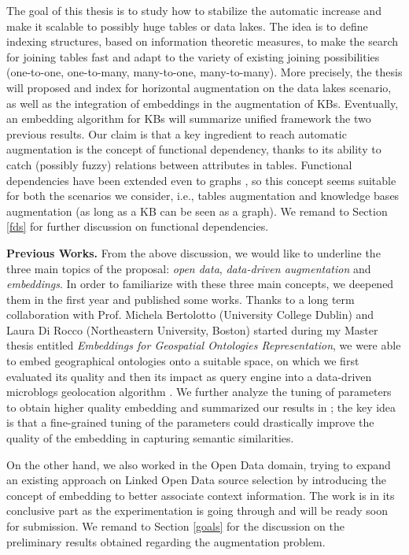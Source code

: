 The goal of this thesis is to study how to stabilize the automatic increase and make it scalable to possibly huge tables or data lakes. The idea is to define indexing structures, based on information theoretic measures, to make the search for joining tables fast and adapt to the variety of existing joining possibilities (one-to-one, one-to-many, many-to-one, many-to-many). More precisely, the thesis will proposed and index for horizontal augmentation on the data lakes scenario, as well as the integration of embeddings in the augmentation of KBs. Eventually, an embedding algorithm for KBs will summarize unified framework the two previous results. Our claim is that a key ingredient to reach automatic augmentation is the concept of functional dependency, thanks to its ability to catch (possibly fuzzy) relations between attributes in tables. Functional dependencies have been extended even to graphs \cite{fan2016functional}, so this concept seems suitable for both the scenarios we consider, i.e., tables augmentation and knowledge bases augmentation (as long as a KB can be seen as a graph). We remand to Section \ref{fds} for further discussion on functional dependencies.


\bigbreak
\textbf{Previous Works.} From the above discussion, we would like to underline the three main topics of the proposal: \textit{open data}, \textit{data-driven augmentation} and \textit{embeddings}. In order to familiarize with these three main concepts, we deepened them in the first year and published some works. Thanks to a long term collaboration with Prof. Michela Bertolotto (University College Dublin) and Laura Di Rocco (Northeastern University, Boston) started during my Master thesis entitled \textit{Embeddings for Geospatial Ontologies Representation}, we were able to embed geographical ontologies onto a suitable space, on which we first evaluated its quality \cite{dassereto2019evaluating} and then its impact as query engine into a data-driven microblogs geolocation algorithm \cite{di2020sherloc}. We further analyze the tuning of parameters to obtain higher quality embedding and summarized our results in \cite{dassereto2020tuning}; the key idea is that a fine-grained tuning of the parameters could drastically improve the quality of the embedding in capturing semantic similarities.

On the other hand, we also worked in the Open Data domain, trying to expand an existing approach on Linked Open Data source selection \cite{beyza2019linked} by introducing the concept of embedding to better associate context information. The work is in its conclusive part as the experimentation is going through and will be ready soon for submission. We remand to Section \ref{goals} for the discussion on the preliminary results obtained regarding the augmentation problem.
\bigbreak


